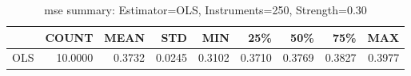 \begin{table}[ht]
\centering
\caption{mse summary: Estimator=OLS, Instruments=250, Strength=0.30}
\begin{tabular}{lrrrrrrrr}
\toprule
 & COUNT & MEAN & STD & MIN & 25\% & 50\% & 75\% & MAX \\
\midrule
OLS & 10.0000 & 0.3732 & 0.0245 & 0.3102 & 0.3710 & 0.3769 & 0.3827 & 0.3977 \\
\bottomrule
\end{tabular}
\end{table}
